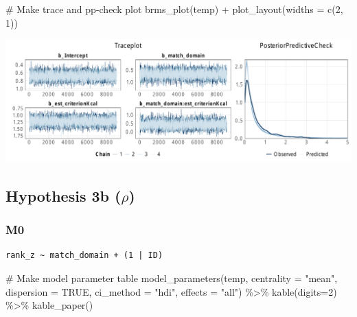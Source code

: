 \documentclass[
  letterpaper,
  DIV=11,
  numbers=noendperiod]{scrartcl}
\newenvironment{Shaded}{\begin{snugshade}}{\end{snugshade}}
\newcommand{\AttributeTok}[1]{\textcolor[rgb]{0.40,0.45,0.13}{#1}}
\newcommand{\CommentTok}[1]{\textcolor[rgb]{0.37,0.37,0.37}{#1}}
\newcommand{\ConstantTok}[1]{\textcolor[rgb]{0.56,0.35,0.01}{#1}}
\newcommand{\DecValTok}[1]{\textcolor[rgb]{0.68,0.00,0.00}{#1}}
\newcommand{\FunctionTok}[1]{\textcolor[rgb]{0.28,0.35,0.67}{#1}}
\newcommand{\NormalTok}[1]{\textcolor[rgb]{0.00,0.23,0.31}{#1}}
\newcommand{\OtherTok}[1]{\textcolor[rgb]{0.00,0.23,0.31}{#1}}
\newcommand{\SpecialCharTok}[1]{\textcolor[rgb]{0.37,0.37,0.37}{#1}}
\newcommand{\StringTok}[1]{\textcolor[rgb]{0.13,0.47,0.30}{#1}}
\begin{document}
\begin{Shaded}
\begin{Highlighting}[]
\CommentTok{\# Make trace and pp{-}check plot}
\FunctionTok{brms\_plot}\NormalTok{(temp) }\SpecialCharTok{+} \FunctionTok{plot\_layout}\NormalTok{(}\AttributeTok{widths =} \FunctionTok{c}\NormalTok{(}\DecValTok{2}\NormalTok{, }\DecValTok{1}\NormalTok{))}
\end{Highlighting}
\end{Shaded}

\includegraphics{supplement_files/figure-pdf/h3aM2-1.pdf}

\subsection{\texorpdfstring{Hypothesis 3b
(\(\rho\))}{Hypothesis 3b (\textbackslash rho)}}\label{hypothesis-3b-rho}

\subsubsection{M0}\label{m0-1}

\begin{Shaded}
\end{Shaded}

\begin{verbatim}
rank_z ~ match_domain + (1 | ID) 
\end{verbatim}

\begin{Shaded}
\begin{Highlighting}[]
\CommentTok{\# Make model parameter table}
\FunctionTok{model\_parameters}\NormalTok{(temp, }\AttributeTok{centrality =} \StringTok{"mean"}\NormalTok{, }\AttributeTok{dispersion =} \ConstantTok{TRUE}\NormalTok{, }
                 \AttributeTok{ci\_method =} \StringTok{"hdi"}\NormalTok{, }\AttributeTok{effects =} \StringTok{"all"}\NormalTok{) }\SpecialCharTok{\%\textgreater{}\%} 
  \FunctionTok{kable}\NormalTok{(}\AttributeTok{digits=}\DecValTok{2}\NormalTok{) }\SpecialCharTok{\%\textgreater{}\%} \FunctionTok{kable\_paper}\NormalTok{()}
\end{Highlighting}
\end{Shaded}
\end{document}
